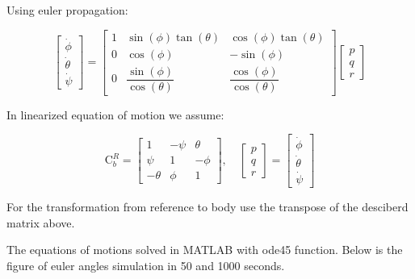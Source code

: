 Using euler propagation:

\begin{equation}
    \begin{bmatrix}
        \dot \phi \\
        \dot \theta \\
        \dot \psi
    \end{bmatrix} = \begin{bmatrix}
        1 & \sin(\phi)\tan(\theta) & \cos(\phi)\tan(\theta)\\
        0 & \cos(\phi) & -\sin(\phi) \\
        0 & \dfrac{\sin(\phi)}{\cos(\theta)} & \dfrac{\cos(\phi)}{\cos(\theta)}
    \end{bmatrix} \begin{bmatrix}
        p \\q \\ r
    \end{bmatrix}
\end{equation}

In linearized equation of motion we assume:

\begin{equation}
    \boldsymbol{\mathrm{C}}_b^R = \begin{bmatrix}
        1 & -\psi & \theta \\
        \psi & 1 & -\phi \\
        -\theta & \phi & 1
    \end{bmatrix}, \quad \begin{bmatrix}
        p \\ q \\ r
    \end{bmatrix} = \begin{bmatrix}
        \dot \phi \\
        \dot \theta \\
        \dot \psi
    \end{bmatrix}
\end{equation}

For the transformation from reference to body use the transpose of the desciberd matrix above.


The equations of motions solved in MATLAB with ode45 function. Below is the figure of euler angles simulation in 50 and 1000 seconds.

